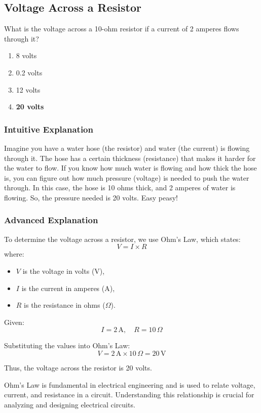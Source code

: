 \subsection{Voltage Across a Resistor}
\label{T5D12}

\begin{tcolorbox}[colback=gray!10!white,colframe=black!75!black,title=T5D12]
What is the voltage across a 10-ohm resistor if a current of 2 amperes flows through it?
\begin{enumerate}[label=\Alph*)]
    \item 8 volts
    \item 0.2 volts
    \item 12 volts
    \item \textbf{20 volts}
\end{enumerate}
\end{tcolorbox}

\subsubsection{Intuitive Explanation}
Imagine you have a water hose (the resistor) and water (the current) is flowing through it. The hose has a certain thickness (resistance) that makes it harder for the water to flow. If you know how much water is flowing and how thick the hose is, you can figure out how much pressure (voltage) is needed to push the water through. In this case, the hose is 10 ohms thick, and 2 amperes of water is flowing. So, the pressure needed is 20 volts. Easy peasy!

\subsubsection{Advanced Explanation}
To determine the voltage across a resistor, we use Ohm's Law, which states:
\[
V = I \times R
\]
where:
\begin{itemize}
    \item \( V \) is the voltage in volts (V),
    \item \( I \) is the current in amperes (A),
    \item \( R \) is the resistance in ohms (\(\Omega\)).
\end{itemize}

Given:
\[
I = 2 \, \text{A}, \quad R = 10 \, \Omega
\]

Substituting the values into Ohm's Law:
\[
V = 2 \, \text{A} \times 10 \, \Omega = 20 \, \text{V}
\]

Thus, the voltage across the resistor is 20 volts.

Ohm's Law is fundamental in electrical engineering and is used to relate voltage, current, and resistance in a circuit. Understanding this relationship is crucial for analyzing and designing electrical circuits.


